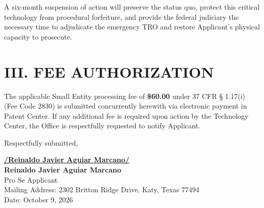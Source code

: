 \documentclass[11pt,letterpaper]{article}
\begin{document}
A six-month suspension of action will preserve the status quo, protect this critical technology from procedural forfeiture, and provide the federal judiciary the necessary time to adjudicate the emergency TRO and restore Applicant's physical capacity to prosecute.

\section*{III. FEE AUTHORIZATION}

The applicable Small Entity processing fee of \textbf{\$60.00} under 37 CFR \S{} 1.17(i) (Fee Code 2830) is submitted concurrently herewith via electronic payment in Patent Center. If any additional fee is required upon action by the Technology Center, the Office is respectfully requested to notify Applicant.

\vspace{0.4cm}
\begin{singlespace}
\noindent Respectfully submitted, \par\vspace{0.8cm}
\underline{\textbf{/Reinaldo Javier Aguiar Marcano/}} \\
\textbf{Reinaldo Javier Aguiar Marcano} \\
Pro Se Applicant \\
Mailing Address: 2302 Britton Ridge Drive, Katy, Texas 77494 \\
Date: October 9, 2026
\end{singlespace}
\end{document}
